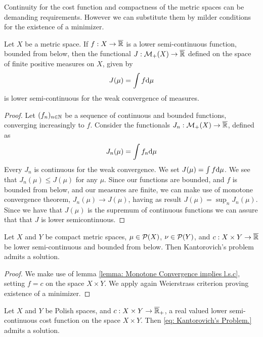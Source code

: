 Continuity for the cost function and compactness of the metric spaces can be demanding requirements. However we can substitute them by milder conditions for the existence of a minimizer. 
\begin{lemma}
	Let $X$ be a metric space. If $f:X\rightarrow\overline{\mathbb{R}}$ is a lower semi-continuous function, bounded from below, then the functional  $J:\mathcal{M}_+(X)\rightarrow \overline{\mathbb{R}}$ defined on the space of finite positive measures on $X$, given by
	\begin{equation*}
		J(\mu)=\int f \mathrm{d}\mu
	\end{equation*} 
	is lower semi-continuous for the weak convergence of measures. \label{lemma: Monotone Convergence implies l.s.c}
\end{lemma}
\begin{proof}
	Let $(f_n)_{n\in \mathbb{N}}$ be a sequence of continuous and bounded functions, converging increasingly to $f$. Consider the functionals $J_n: \mathcal{M}_+(X)\rightarrow\overline{\mathbb{R}}$, defined as
	\begin{equation*}
			J_n(\mu)=\int f_n \mathrm{d}\mu
	\end{equation*}	
	Every $J_n$ is continuous for the weak convergence. We set $J(\mu)=\int f \mathrm{d}\mu$. We see that $J_n(\mu) \leq J(\mu)$ for any $\mu$. Since our functions are bounded, and $f$ is bounded from below, and our measures are finite, we can make use of monotone convergence theorem, $J_n(\mu)\rightarrow J(\mu)$, having as result $J(\mu)=\sup_{n} J_n(\mu)$. Since we have that $J(\mu)$ is the supremum of continuous functions we can assure that that $J$ is lower semicontinuous.
\end{proof}
\begin{theorem}
	Let $X$ and $Y$ be compact metric spaces, $\mu \in \mathcal{P}(X)$, $\nu \in\mathcal{P}(Y)$, and $c:X\times Y\rightarrow \overline{\mathbb{R}} $  be lower semi-continuous and bounded from below. Then Kantorovich's problem admits a solution.
\end{theorem}

\begin{proof}
We make use of lemma \ref{lemma: Monotone Convergence implies l.s.c}, setting $f=c$ on the space $X\times Y$. We apply again Weierstrass criterion proving existence of a minimizer.
\end{proof}

\begin{theorem}
Let $X$ and $Y$ be Polish spaces, and $c:X\times Y \rightarrow \overline{\mathbb{R}}_+$, a real valued lower semi-continuous cost function on the space $X\times Y$. Then \eqref{eq: Kantorovich's Problem.} admits a solution.
\end{theorem}

